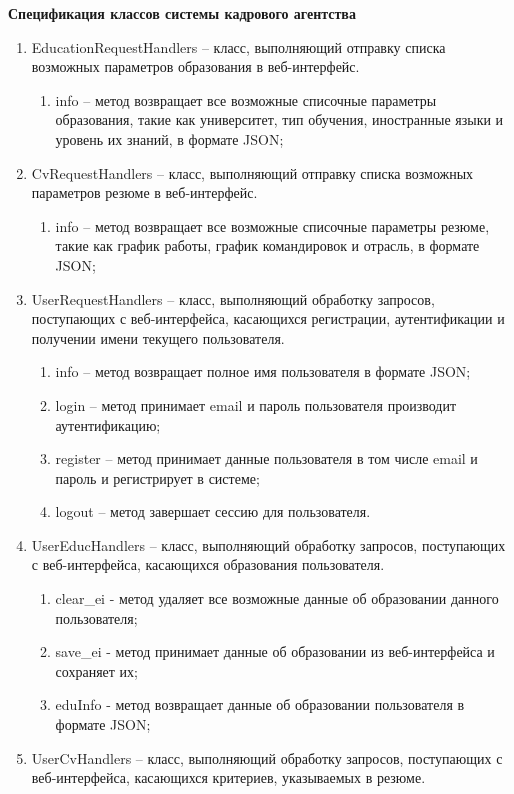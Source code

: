 \textbf{Спецификация классов системы кадрового агентства}
\begin{enumerate}
\item EducationRequestHandlers – класс, выполняющий отправку списка возможных параметров образования в веб-интерфейс.
	\begin{enumerate}
	\item info – метод возвращает все возможные списочные параметры образования, такие как университет, тип обучения, иностранные языки и уровень их знаний, в формате JSON;
	\end{enumerate}
\item CvRequestHandlers – класс, выполняющий отправку списка возможных параметров резюме в веб-интерфейс.
	\begin{enumerate}
	\item info – метод возвращает все возможные списочные параметры резюме, такие как график работы, график командировок и отрасль, в формате JSON;
	\end{enumerate}
\item UserRequestHandlers – класс, выполняющий обработку запросов, поступающих с веб-интерфейса, касающихся регистрации, аутентификации и получении имени текущего пользователя.
	\begin{enumerate}
	\item info – метод возвращает полное имя пользователя в формате JSON;
	\item login – метод принимает email и пароль пользователя производит аутентификацию;
	\item register – метод принимает данные пользователя в том числе email и пароль и регистрирует в системе;
	\item logout – метод завершает сессию для пользователя.                  
	\end{enumerate}
\item UserEducHandlers – класс, выполняющий обработку запросов, поступающих с веб-интерфейса, касающихся образования пользователя.
	\begin{enumerate}
	\item clear_ei - метод удаляет все возможные данные об образовании данного пользователя;
	\item save_ei - метод принимает данные об образовании из веб-интерфейса и сохраняет их;
	\item eduInfo - метод возвращает данные об образовании пользователя в формате JSON;
	\end{enumerate}
\item UserCvHandlers – класс, выполняющий обработку запросов, поступающих с веб-интерфейса, касающихся критериев, указываемых в резюме.

\end{enumerate}
